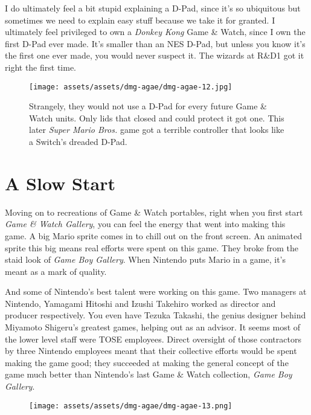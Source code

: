 \documentclass{book}
\begin{document}
I do ultimately feel a bit stupid explaining a D-Pad, since it’s so ubiquitous but sometimes we need to explain easy stuff because we take it for granted. I ultimately feel privileged to own a \emph{Donkey Kong} Game \& Watch, since I own the first D-Pad ever made. It’s smaller than an NES D-Pad, but unless you know it’s the first one ever made, you would never suspect it. The wizards at R\&D1 got it right the first time.

\begin{figure}[hbt]
\vskip 10pt
\centering \texttt{[image: assets/assets/dmg-agae/dmg-agae-12.jpg]}\par\pagetwodescription Strangely, they would not use a D-Pad for every future Game \& Watch units. Only lids that closed and could protect it got one. This later \emph{Super Mario Bros.} game got a terrible controller that looks like a Switch’s dreaded D-Pad.
\vskip 6pt
\end{figure}

\FloatBarrier\needspace{5pt}\section*{A Slow Start}\nopagebreak[4]

Moving on to recreations of Game \& Watch portables, right when you first start \emph{Game \& Watch Gallery}, you can feel the energy that went into making this game. A big Mario sprite comes in to chill out on the front screen. An animated sprite this big means real efforts were spent on this game. They broke from the staid look of \emph{Game Boy Gallery}. When Nintendo puts Mario in a game, it’s meant as a mark of quality.

And some of Nintendo’s best talent were working on this game. Two managers at Nintendo, Yamagami Hitoshi and Izushi Takehiro worked as director and producer respectively. You even have Tezuka Takashi, the genius designer behind Miyamoto Shigeru’s greatest games, helping out as an advisor. It seems most of the lower level staff were TOSE employees. Direct oversight of those contractors by three Nintendo employees meant that their collective efforts would be spent making the game good; they succeeded at making the general concept of the game much better than Nintendo’s last Game \& Watch collection, \emph{Game Boy Gallery}.

\begin{figure}[hbt]
\vskip 10pt
\centering \texttt{[image: assets/assets/dmg-agae/dmg-agae-13.png]}
\vskip 6pt
\end{figure}
\end{document}
